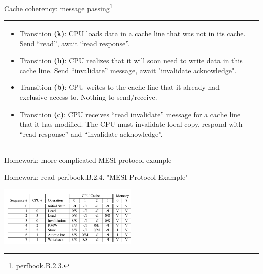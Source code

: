 \begin{frame}[fragile]{Cache coherency: message passing\footnote{perfbook.B.2.3.}}



\begin{tabular}{p{10cm}p{5cm}}

\begin{itemize}
    \item Transition \textbf{(k)}: CPU loads data in a cache line that was not in its cache. Send “read”, await “read response”.

    \item Transition \textbf{(h)}: CPU realizes that it will soon need to write data in this cache line. Send “invalidate” message, await "invalidate acknowledge". 

    \item Transition \textbf{(b)}: CPU writes to the cache line that it already had exclusive access to. Nothing to send/receive.

    \item Transition \textbf{(c)}: CPU receives “read invalidate” message for a cache line that it has modified. The CPU must invalidate local copy, respond with “read response” and “invalidate acknowledge”.
\end{itemize}

 &
 
\end{tabular}

\end{frame}

\begin{frame}{Homework: more complicated MESI protocol example}

Homework: read perfbook.B.2.4. "MESI Protocol Example"

\begin{center}
    \includegraphics[width=0.5\textwidth]{./pics/mesi-sample.png}
\end{center}

\end{frame}


